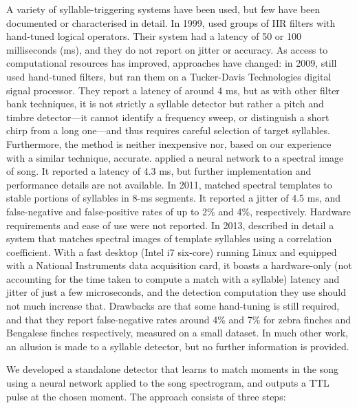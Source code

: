 \documentclass[10pt,letterpaper]{article}
\begin{document}
A variety of syllable-triggering systems have been used, but few have been documented or characterised in detail.  In 1999, \cite{Leonardo1999}  used groups of IIR filters with hand-tuned logical operators.  Their system had a latency of 50 or 100 milliseconds (ms), and they do not report on jitter or accuracy.  As access to computational resources has improved, approaches have changed: in 2009, \cite{Andalman2009} still used hand-tuned filters, but ran them on a Tucker-Davis Technologies digital signal processor.  They report a latency of around 4 ms, but as with other filter bank techniques, it is not strictly a syllable detector but rather a pitch and timbre detector---it cannot identify a frequency sweep, or distinguish a short chirp from a long one---and thus requires careful selection of target syllables.  Furthermore, the method is neither inexpensive nor, based on our experience with a similar technique, accurate.  \cite{Keller2009} applied a neural network to a spectral image of song.  It reported a latency of 4.3 ms, but further implementation and performance details are not available.  In 2011, \cite{Warren2011} matched spectral templates to stable portions of syllables in 8-ms segments.  It reported a jitter of 4.5 ms, and false-negative and false-positive rates of up to 2\% and 4\%, respectively.  Hardware requirements and ease of use were not reported.  In 2013, \cite{Skocik2013} described in detail a system that matches spectral images of template syllables using a correlation coefficient.  With a fast desktop (Intel i7 six-core) running Linux and equipped with a National Instruments data acquisition card, it boasts a hardware-only (not accounting for the time taken to compute a match with a syllable) latency and jitter of just a few microseconds, and the detection computation they use should not much increase that.  Drawbacks are that some hand-tuning is still required, and that they report false-negative rates around 4\% and 7\% for zebra finches and Bengalese finches respectively, measured on a small dataset.  In much other work, an allusion is made to a syllable detector, but no further information is provided.

We developed a standalone detector that learns to match moments in the
song using a neural network applied to the song spectrogram, and
outputs a TTL pulse at the chosen moment. The approach consists of
three steps:
\end{document}
